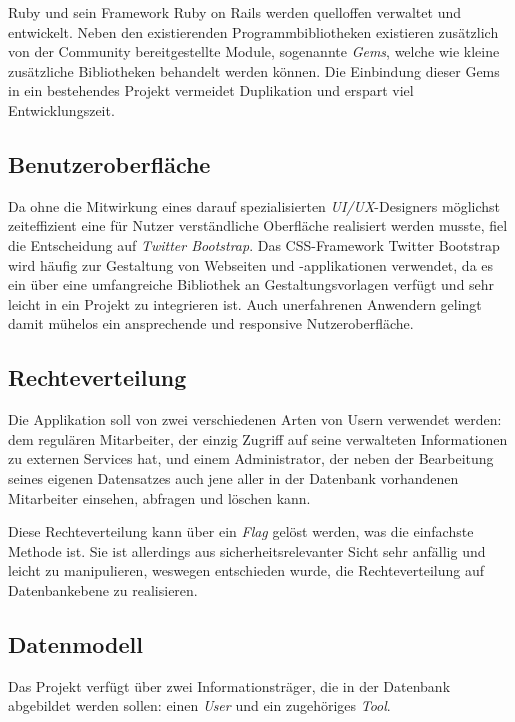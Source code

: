 Ruby und sein Framework Ruby on Rails werden quelloffen verwaltet und entwickelt. Neben den
existierenden Programmbibliotheken existieren zusätzlich von der Community bereitgestellte Module,
sogenannte \textit{Gems}, welche wie kleine zusätzliche Bibliotheken behandelt werden können. Die
Einbindung dieser Gems in ein bestehendes Projekt vermeidet Duplikation und erspart viel
Entwicklungszeit.

\subsection{Benutzeroberfläche}
\label{sec:Benutzeroberfläche}
Da ohne die Mitwirkung eines darauf spezialisierten \textit{UI/UX}-Designers möglichst zeiteffizient
eine für Nutzer verständliche Oberfläche realisiert werden musste, fiel die Entscheidung auf
\textit{Twitter Bootstrap}.
Das CSS-Framework Twitter Bootstrap wird häufig zur Gestaltung von Webseiten und
-applikationen verwendet, da es ein über eine umfangreiche Bibliothek an Gestaltungsvorlagen
verfügt und sehr leicht in ein Projekt zu integrieren ist. Auch unerfahrenen Anwendern gelingt damit
mühelos ein ansprechende und responsive Nutzeroberfläche.

\subsection{Rechteverteilung}
\label{sec:Rechteverteilung}
Die Applikation soll von zwei verschiedenen Arten von Usern verwendet werden: dem regulären
Mitarbeiter, der einzig Zugriff auf seine verwalteten Informationen zu externen Services hat, und
einem Administrator, der neben der Bearbeitung seines eigenen Datensatzes auch jene aller in der
Datenbank vorhandenen Mitarbeiter einsehen, abfragen und löschen kann.

Diese Rechteverteilung kann über ein \textit{Flag} gelöst werden, was die einfachste Methode ist.
Sie ist allerdings aus sicherheitsrelevanter Sicht sehr anfällig und leicht zu manipulieren,
weswegen entschieden wurde, die Rechteverteilung auf Datenbankebene zu realisieren.

\subsection{Datenmodell}
\label{sec:Datenmodell}
Das Projekt verfügt über zwei Informationsträger, die in der Datenbank abgebildet werden
sollen: einen \textit{User} und ein zugehöriges \textit{Tool}.


